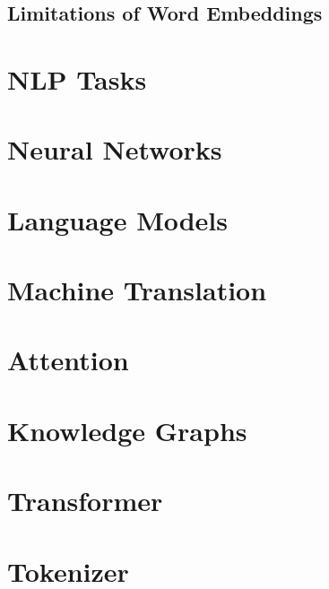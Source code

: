 \documentclass[12pt]{scrartcl}
\begin{document}
\subsection{Limitations of Word Embeddings}
    

\section{NLP Tasks}

\section{Neural Networks}

\section{Language Models}

\section{Machine Translation}

\section{Attention}

\section{Knowledge Graphs}

\section{Transformer}

\section{Tokenizer}
\end{document}
